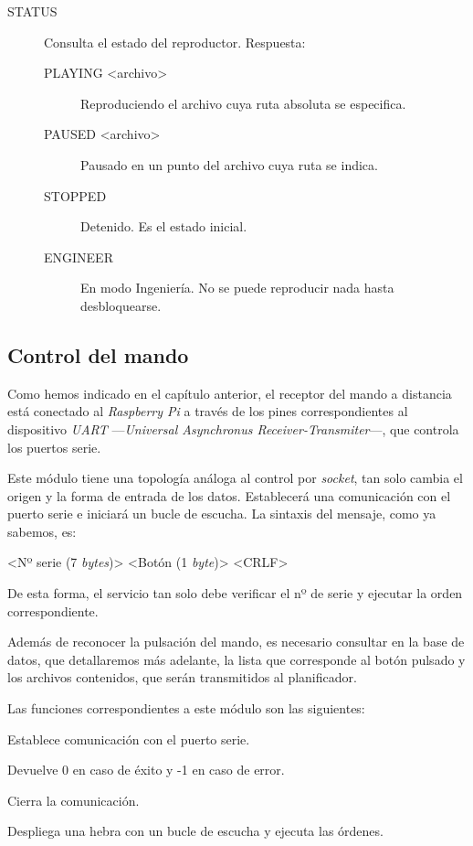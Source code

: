 \begin{description}
	\item[STATUS] Consulta el estado del reproductor. Respuesta:
	
	\begin{description}
		\item[PLAYING <archivo>] Reproduciendo el archivo cuya ruta absoluta se especifica.
		\item[PAUSED <archivo>] Pausado en un punto del archivo cuya ruta se indica.
		\item[STOPPED] Detenido. Es el estado inicial.
		\item[ENGINEER] En modo Ingeniería. No se puede reproducir nada hasta desbloquearse.
	\end{description}
	
\end{description}

\subsection{Control del mando}

Como hemos indicado en el capítulo anterior, el receptor del mando a distancia está conectado al \textit{Raspberry Pi} a través de los pines correspondientes al dispositivo \textit{UART} ---\textit{Universal Asynchronus Receiver-Transmiter}---, que controla los puertos serie.

Este módulo tiene una topología análoga al control por \textit{socket}, tan solo cambia el origen y la forma de entrada de los datos. Establecerá una comunicación con el puerto serie e iniciará un bucle de escucha. La sintaxis del mensaje, como ya sabemos, es:

\begin{center}
	<Nº serie (7 \textit{bytes})> <Botón (1 \textit{byte})> <CRLF>
\end{center}

De esta forma, el servicio tan solo debe verificar el nº de serie y ejecutar la orden correspondiente.

Además de reconocer la pulsación del mando, es necesario consultar en la base de datos, que detallaremos más adelante, la lista que corresponde al botón pulsado y los archivos contenidos, que serán transmitidos al planificador.

Las funciones correspondientes a este módulo son las siguientes:

\begin{description}[style=nextline]
	\item[uart\_init () : \textit{dword}]
	Establece comunicación con el puerto serie.
	
	Devuelve 0 en caso de éxito y -1 en caso de error.
	
	\item[uart\_destroy ()]
	Cierra la comunicación.
	
	\item[uart\_loop ()]
	Despliega una hebra con un bucle de escucha y ejecuta las órdenes.
	
\end{description}

